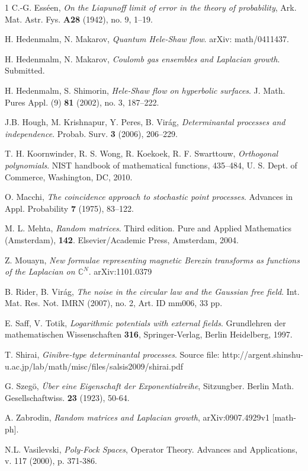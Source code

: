 \documentclass{birkart}
\theoremstyle{definition}
\theoremstyle{remark}
\numberwithin{equation}{section}
\numberwithin{figure}{section}
\newcommand{\1}{{\mathbf 1}}
\newcommand{\C}{{\mathbb C}}
\begin{document}
\begin{thebibliography}{1}
C.-G. Esséen, \textit{On the Liapunoff limit of error in the theory 
of probability}, Ark. Mat. Astr. Fys. {\bf A28} (1942), no. 9, 1--19.


 H. Hedenmalm, N. Makarov, \textit{Quantum Hele-Shaw flow}.
arXiv: math/0411437.

 H. Hedenmalm, N. Makarov, \textit{Coulomb gas ensembles and
Laplacian growth}. Submitted.

 H. Hedenmalm, S. Shimorin, \textit{Hele-Shaw flow on 
hyperbolic surfaces}. J. Math. Pures Appl. (9) {\bf81} (2002), no. 3, 
187--222.

 J.B. Hough, M.  Krishnapur, Y. Peres, B. Vir\'{a}g, 
\textit{Determinantal processes and independence}. Probab. Surv. {\bf3} 
(2006), 206--229. 

T. H. Koornwinder, R. S. Wong, R. Koekoek, R. F. Swarttouw, 
\textit{Orthogonal polynomials}. NIST handbook of mathematical functions, 
435--484, U. S. Dept. of Commerce, Washington, DC, 2010.

 O. Macchi, \textit{The coincidence approach to stochastic 
point processes}. Advances in Appl. Probability {\bf7} (1975), 83--122.
 
 M. L. Mehta, \textit{Random matrices}.
Third edition. Pure and Applied Mathematics (Amsterdam), {\bf142}. 
Elsevier/Academic Press, Amsterdam, 2004. 

 Z. Mouayn, \textit{New formulae representing magnetic Berezin
transforms as functions of the Laplacian on $\C^N$}. arXiv:1101.0379

 B. Rider, B. Vir\'{a}g, \textit{The noise in the circular law 
and the Gaussian free field}. Int. Mat. Res. Not. IMRN (2007), no. 2, Art. ID 
mm006, 33 pp.
  
 E. Saff, V. Totik, \textit{Logarithmic potentials with external 
fields}. Grundlehren der mathematischen Wissenschaften {\bf316}, 
Springer-Verlag, Berlin Heidelberg, 1997. 

 T. Shirai, \textit{Ginibre-type determinantal processes}.
Source file: 
http://argent.shinshu-u.ac.jp/lab/math/misc/files/salsis2009/shirai.pdf

G. Szeg\"o, \textit{\"Uber eine Eigenschaft der Exponentialreihe}, Sitzungber. 
Berlin Math. Gesellschaftwiss. {\bf23} (1923), 50-64.

 A. Zabrodin, \textit{Random matrices and Laplacian 
growth}, arXiv:0907.4929v1 [math-ph].

 N.L. Vasilevski, \textit{Poly-Fock Spaces}, Operator Theory. 
Advances and Applications, v. 117 (2000), p. 371-386.

\end{thebibliography}
\end{document}
